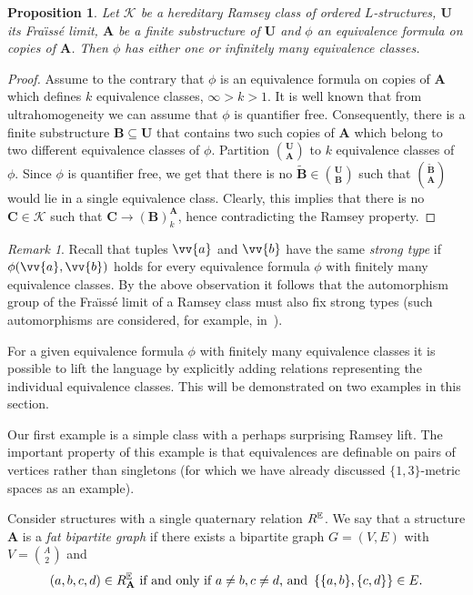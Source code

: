\documentclass{elsarticle}
\def\str#1{\mathbf {#1}}
\def\nbrel#1#2{R\ifstrempty{#1}{}{_{#1}}\ifstrempty{#2}{}{^{#2}}}
\def\rel#1#2{\nbrel{\ifstrempty{#1}{}{\str{#1}}}{#2}}
\def\Fraisse{Fra\"{\i}ss\' e}
\theoremstyle{plain}
\newtheorem{prop}[theorem]{Proposition}
\theoremstyle{definition}
\theoremstyle{remark}
\newtheorem*{remark}{Remark}
\begin{document}
\begin{prop}
\label{prop:imaginary}Let $\mathcal K$ be a hereditary Ramsey class of ordered $L$-structures, $\str{U}$ its \Fraisse{} limit,
$\str{A}$ be a finite substructure of $\str{U}$ and $\phi$ an equivalence formula on copies of $\str{A}$.
Then $\phi$ has either one or infinitely many equivalence classes.
\end{prop}
\begin{proof}
Assume to the contrary that $\phi$ is an equivalence formula on copies of $\str{A}$ which defines $k$ equivalence classes, $\infty>k>1$.
 It is well known that from ultrahomogeneity we can assume that $\phi$ is quantifier free.
Consequently, there is a finite substructure $\str{B}\subseteq \str U$ that contains two such copies of $\str{A}$ which belong to two different equivalence classes of $\phi$.
Partition $\str U\choose \str A$ to $k$ equivalence classes of $\phi$. Since $\phi$ is quantifier free, we get that there is no $\widetilde{\str B}\in {\str U \choose \str B}$ such that $\widetilde{\str B}\choose \str A$ would lie in a single equivalence class. Clearly, this implies that there is no $\str C\in \mathcal K$ such that $\str{C}\longrightarrow (\str{B})^\str{A}_k$, hence contradicting the Ramsey property.
\end{proof}
\begin{remark}
Recall that tuples $\vv{a}$ and $\vv{b}$ have the same \emph{strong type} if
$\phi(\vv{a},\vv{b})$ holds for every equivalence formula $\phi$ with finitely many
equivalence classes.
By the above observation it follows that the automorphism group of the \Fraisse{}  
limit of a Ramsey class must also fix strong types (such automorphisms are considered, for example, in~\cite{Ivanov1997}).
\end{remark}

For a given equivalence formula $\phi$ with finitely many equivalence classes
it is possible to lift the language by explicitly adding relations representing the
individual equivalence classes. This will be demonstrated on two examples in
this section.

Our first example is  a simple class with a perhaps surprising Ramsey lift.
The important property of this example is that equivalences are definable on pairs of vertices rather than singletons
(for which we have already discussed $\{1,3\}$-metric spaces as an example).

Consider structures with a single quaternary relation $\rel{}{\mathbb E}$. We say that
a structure $\str{A}$ is a \emph{fat bipartite graph} if there exists a
bipartite graph $G=(V,E)$ with $V={A\choose 2}$ and
$$(a,b,c,d)\in \rel{A}{\mathbb E} \hbox{ if and only if } a\neq b, c\neq d\hbox{, and } \left\{\{a,b\},\{c,d\}\right\}\in E.$$
\end{document}

